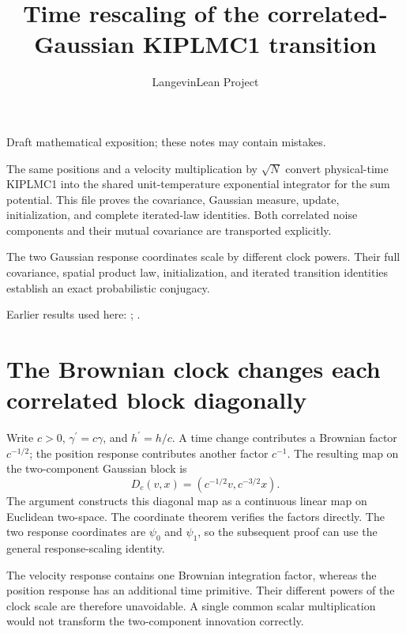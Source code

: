 \documentclass[11pt,a4paper]{article}
\title{\texorpdfstring{Time rescaling of the correlated-Gaussian KIPLMC1 transition}{Time rescaling of the correlated-Gaussian KIPLMC1 transition}}
\author{LangevinLean Project}
\date{}
\begin{document}
\maketitle
Draft mathematical exposition; these notes may contain mistakes.


The same positions and a velocity multiplication by \(\sqrt N\) convert physical-time KIPLMC1 into the shared unit-temperature exponential integrator for the sum potential. This file proves the covariance, Gaussian measure, update, initialization, and complete iterated-law identities. Both correlated noise components and their mutual covariance are transported explicitly.



The two Gaussian response coordinates scale by different clock powers. Their full covariance, spatial product law, initialization, and iterated transition identities establish an exact probabilistic conjugacy.



Earlier results used here: \cite[Section~3.113]{LangevinLean2026Kinetic}; \cite[Section~3.26]{LangevinLean2026Kinetic}.

\section{\texorpdfstring{The Brownian clock changes each correlated block diagonally}{The Brownian clock changes each correlated block diagonally}}


Write \(c>0\), \(\gamma^\prime=c\gamma\), and \(h^\prime=h/c\). A time change contributes a Brownian factor \(c^{-1/2}\); the position response contributes another factor \(c^{-1}\). The resulting map on the two-component Gaussian block is \[D_c(v,x)=(c^{-1/2}v,c^{-3/2}x).\] The argument constructs this diagonal map as a continuous linear map on Euclidean two-space. The coordinate theorem verifies the factors directly. The two response coordinates are \(\psi_0\) and \(\psi_1\), so the subsequent proof can use the general response-scaling identity.



The velocity response contains one Brownian integration factor, whereas the position response has an additional time primitive. Their different powers of the clock scale are therefore unavoidable. A single common scalar multiplication would not transform the two-component innovation correctly.
\end{document}
